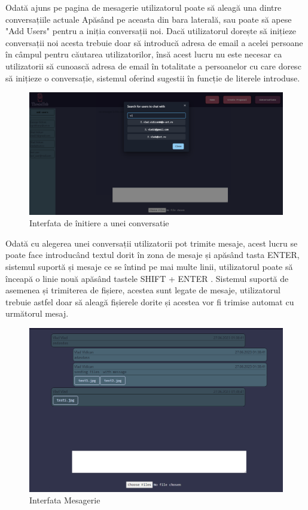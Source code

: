 \documentclass[12pt,a4paper,hidelinks]{report}
\theoremstyle{definition}
\theoremstyle{remark}
\begin{document}
Odată ajuns pe pagina de mesagerie utilizatorul poate să aleagă una dintre conversațiile actuale
Apăsând pe aceasta din bara laterală, sau poate să apese "Add Users" pentru a iniția conversații noi.
Dacă utilizatorul dorește să inițieze conversații noi acesta trebuie doar să introducă adresa de email
a acelei persoane în câmpul pentru căutarea utilizatorilor, însă acest lucru nu este necesar
ca utilizatorii să cunoască adresa de email în totalitate a persoanelor cu care doresc să inițieze o conversație, 
sistemul oferind sugestii în funcție de literele introduse.

\begin{figure}[H]
    \centering
    \includegraphics[scale=0.3]{images/AddUser.PNG}
    \caption{Interfata de înitiere a unei conversatie}
\end{figure}
Odată cu alegerea unei conversații utilizatorii pot trimite mesaje, acest lucru se poate face  
introducând textul dorit în zona de mesaje și apăsând tasta ENTER,  
sistemul suportă și mesaje ce se întind pe mai multe linii, utilizatorul poate să înceapă o linie nouă apăsând tastele SHIFT + ENTER
. Sistemul suportă de asemenea și trimiterea de fișiere, acestea sunt legate de mesaje, utilizatorul trebuie astfel doar să aleagă
fișierele dorite și acestea vor fi trimise automat cu următorul mesaj.
\begin{figure}[H]
    \centering
    \includegraphics[scale=0.3]{images/SendMessages.PNG}
    \caption{Interfata Mesagerie}
\end{figure}
\end{document}
